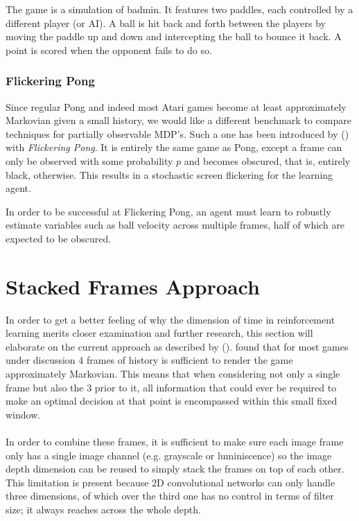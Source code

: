 The game is a simulation of badmin.
It features two paddles,
each controlled by a different player (or AI).
A ball is hit back and forth between the players
by moving the paddle up and down
and intercepting the ball to bounce it back.
A point is scored when the opponent
fails to do so.

\subsubsection{Flickering Pong}
Since regular Pong and indeed most Atari games
become at least approximately Markovian
given a small history,
we would like a different benchmark
to compare techniques
for partially observable MDP's.
Such a one has been introduced by \citeauthor{Hausknecht2015} (\citeyear{Hausknecht2015})
with \textit{Flickering Pong}.
It is entirely the same game as Pong,
except a frame can only be observed with some probability $p$
and becomes obscured, that is, entirely black, otherwise.
This results in a stochastic screen flickering for the learning agent.

In order to be successful at Flickering Pong,
an agent must learn to robustly
estimate variables such as ball velocity
across multiple frames,
half of which are expected to be obscured.

\paragraph{}

\section{Stacked Frames Approach}
\label{sec:stacked_frames_approach}
In order to get a better feeling
of why the dimension of time in reinforcement learning
merits closer examination and further research,
this section will elaborate on the current approach
as described by
\citeauthor{Mnih2013} (\citeyear{Mnih2013}).
\citeauthor{Mnih2013}
found that for most games under discussion
4 frames of history is sufficient to render the game approximately Markovian.
This means that when considering not only a single frame
but also the 3 prior to it,
all information that could ever be required to make an optimal decision
at that point is encompassed within this small fixed window.

\paragraph{}
In order to combine these frames,
it is sufficient to make sure each image frame only has a single image channel
(e.g. grayscale or luminiscence)
so the image depth dimension can be reused
to simply stack the frames on top of each other.
This limitation is present because 2D convolutional networks
can only handle three dimensions,
of which over the third one has no control in terms of filter size;
it always reaches across the whole depth.

